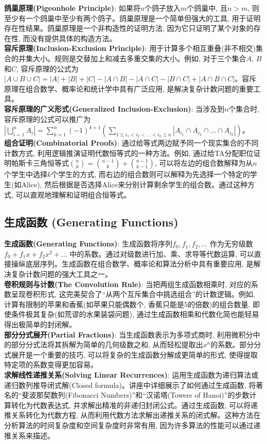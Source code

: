 \documentclass[12pt, a4paper, UTF8]{ctexart}
\newcommand{\term}[1]{\textbf{\textcolor{blue!80!black}{#1}}}
\begin{document}
\begin{sloppypar}
    \term{鸽巢原理(Pigeonhole Principle)}: 如果将$n$个鸽子放入$m$个鸽巢中, 且$n > m$, 则至少有一个鸽巢中至少有两个鸽子。鸽巢原理是一个简单但强大的工具, 用于证明存在性结果。鸽巢原理是一个非构造性的证明方法, 因为它只证明了某个对象的存在性, 而没有提供具体的构造方法。\\
    \term{容斥原理(Inclusion-Exclusion Principle)}: 用于计算多个相互重叠(非不相交)集合的并集大小。规则是交替加上和减去多重交集的大小。例如, 对于三个集合$A$, $B$和$C$, 容斥原理的公式为$|A \cup B \cup C| = |A| + |B| + |C| - |A \cap B| - |A \cap C| - |B \cap C| + |A \cap B \cap C|$。容斥原理在组合数学、概率论和统计学中具有广泛应用, 是解决复杂计数问题的重要工具。\\
    \term{容斥原理的广义形式(Generalized Inclusion-Exclusion)}: 当涉及到$n$个集合时, 容斥原理的公式可以推广为$|\bigcup\limits_{i=1}^{n} A_i| = \sum\limits_{k=1}^{n} (-1)^{k+1} \left( \sum\limits_{1 \leq i_1 < i_2 < \dots < i_k \leq n} |A_{i_1} \cap A_{i_2} \cap \dots \cap A_{i_k}| \right)$。\\
    \term{组合证明(Combinatorial Proofs)}: 通过给等式两边赋予同一个现实集合的不同计数方式, 利用逻辑推演证明代数恒等式的一种方法。例如, 通过给TA分配职位证明帕斯卡三角恒等式$\binom{n}{k} = \binom{n-1}{k} + \binom{n-1}{k-1}$, 可以将左边的组合数解释为从$n$个学生中选择$k$个学生的方式, 而右边的组合数则可以解释为先选择一个特定的学生(如Alice), 然后根据是否选择Alice来分别计算剩余学生的组合数。通过这种方式, 可以直观地理解和证明组合恒等式。

    \subsection{生成函数 (Generating Functions)}
    \term{生成函数(Generating Functions)}: 生成函数将序列$f_0, f_1, f_2, \dots$ 作为无穷级数 $f_0 + f_1x + f_2x^2 + \dots$ 中的系数。通过对级数进行加、乘、求导等代数运算, 可以直接操纵底层序列。生成函数在组合数学、概率论和算法分析中具有重要应用, 是解决复杂计数问题的强大工具之一。\\
    \term{卷积规则与计数(The Convolution Rule)}: 当把两组生成函数相乘时, 对应的系数呈现卷积形式, 这完美契合了“从两个互斥集合中挑选组合”的计数逻辑。例如, 计算有限制的苹果和香蕉(如苹果只能偶数个, 香蕉只能是5的倍数)的组合数量, 即使条件极其复杂(如荒谬的水果装袋问题), 通过生成函数相乘和代数化简也能轻易得出极简单的封闭解。\\
    \term{部分分式展开(Partial Fractions)}: 当生成函数表示为多项式商时, 利用微积分中的部分分式法将其拆解为简单的几何级数之和, 从而轻松提取出$x^n$的系数。部分分式展开是一个重要的技巧, 可以将复杂的生成函数分解成更简单的形式, 使得提取特定项的系数变得更加容易。\\
    \term{求解线性递推关系(Solving Linear Recurrences)}: 运用生成函数为递归算法或递归数列推导闭式解(Closed formula)。讲座中详细展示了如何通过生成函数, 将著名的“斐波那契数列(Fibonacci Numbers)”和“汉诺塔(Towers of Hanoi)”的步数计算转化为代数表达式, 并求解出精准的非递归封闭公式。通过生成函数, 可以将递推关系转化为代数方程, 从而利用代数方法求解出递推关系的闭式解。这种方法在分析算法的时间复杂度和空间复杂度时非常有用, 因为许多算法的性能可以通过递推关系来描述。
    \newpage


\end{sloppypar}
\end{document}
